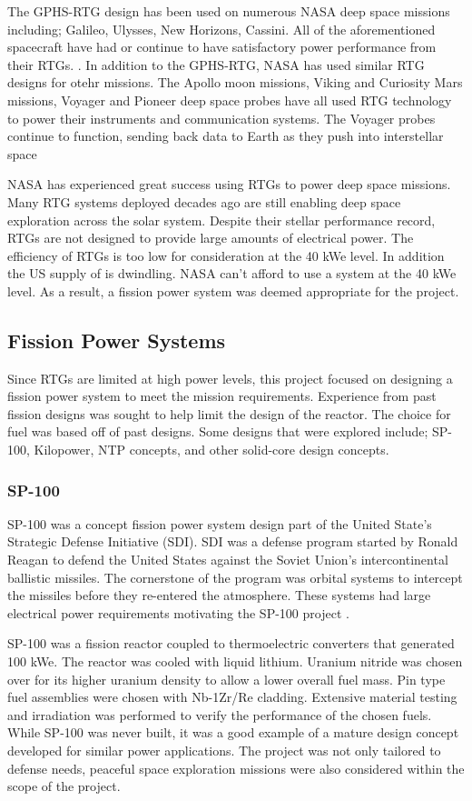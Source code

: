 The GPHS-RTG design has been used on
numerous NASA deep space missions including; Galileo, Ulysses, New Horizons,
Cassini. All of the aforementioned spacecraft have had or continue to have
satisfactory power performance from their RTGs. \citep{bennett_mission_2006}.
In addition to the GPHS-RTG, NASA has used similar RTG designs for otehr
missions. The Apollo moon missions, Viking and Curiosity Mars missions, Voyager
and Pioneer deep space probes have all used RTG technology to power their
instruments and communication systems. The Voyager probes continue to function,
sending back data to Earth as they push into interstellar space
\citep{mmrtg_fact}  

NASA has experienced great success using RTGs to power deep space missions. Many
RTG systems deployed decades ago are still enabling deep space exploration
across the solar system. Despite their stellar performance record, RTGs are not
designed to provide large amounts of electrical power. The efficiency of RTGs is
too low for consideration at the 40 kWe level. In addition the US supply of \pu
is dwindling. NASA can't afford to use a \pu system at the 40 kWe level. As a
result, a fission power system was deemed appropriate for the project.

\subsection{Fission Power Systems}
Since RTGs are limited at high power levels, this project focused on designing a
fission power system to meet the mission requirements. Experience from past
fission designs was sought to help limit the design of the reactor. The choice
for fuel was based off of past designs. Some designs that were explored include;
SP-100, Kilopower, NTP concepts, and other solid-core design concepts.
    \subsubsection{SP-100}
    SP-100 was a concept fission power system design part of the United State's
    Strategic Defense Initiative (SDI). SDI was a defense program started by
    Ronald Reagan to defend the United States against the Soviet Union's intercontinental
    ballistic missiles. The cornerstone of the program was orbital systems to
    intercept the missiles before they re-entered the atmosphere. These systems
    had large electrical power requirements motivating the SP-100 project
    \citep{sp100}.

    SP-100 was a fission reactor coupled to thermoelectric converters that
    generated 100 kWe. The reactor was cooled with liquid lithium. Uranium
    nitride was chosen over \uox for its higher uranium density to allow a lower
    overall fuel mass. Pin type fuel assemblies were chosen with Nb-1Zr/Re
    cladding. Extensive material testing and irradiation was performed to
    verify the performance of the chosen fuels. While SP-100 was never built, it
    was a good example of a mature design concept developed for similar power
    applications. The project was not only tailored to defense needs, peaceful
    space exploration missions were also considered within the scope of the
    project.

